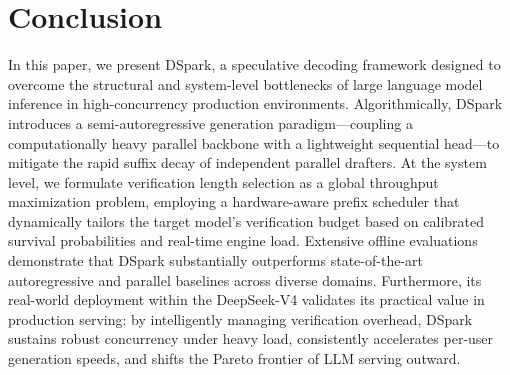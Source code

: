 \section{Conclusion}
\label{sec:conclusion}

In this paper, we present DSpark, a speculative decoding framework designed to overcome the structural and system-level bottlenecks of large language model inference in high-concurrency production environments. Algorithmically, DSpark introduces a semi-autoregressive generation paradigm---coupling a computationally heavy parallel backbone with a lightweight sequential head---to mitigate the rapid suffix decay of independent parallel drafters. At the system level, we formulate verification length selection as a global throughput maximization problem, employing a hardware-aware prefix scheduler that dynamically tailors the target model's verification budget based on calibrated survival probabilities and real-time engine load. Extensive offline evaluations demonstrate that DSpark substantially outperforms state-of-the-art autoregressive and parallel baselines across diverse domains. Furthermore, its real-world deployment within the DeepSeek-V4 validates its practical value in production serving: by intelligently managing verification overhead, DSpark sustains robust concurrency under heavy load, consistently accelerates per-user generation speeds, and shifts the Pareto frontier of LLM serving outward.